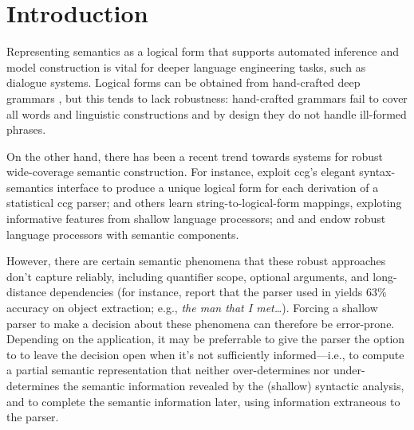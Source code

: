 \section{Introduction} \label{sec:intro}

Representing semantics as a logical form that supports automated
inference and model construction is vital for deeper language
engineering tasks, such as dialogue systems.  Logical forms
can be obtained from hand-crafted deep grammars
\cite{butt:etal:1999,copestake:flickinger:2000}, but this
tends to lack robustness: hand-crafted grammars fail to cover all
words and linguistic constructions and by design they do not handle
ill-formed phrases. 

On the other hand, there has been a recent trend towards systems for
robust wide-coverage semantic construction.  For instance,
\cite{bos:etal:2004} exploit
{\sc ccg}'s elegant syntax-semantics interface to produce a unique
logical form for each derivation of
a statistical {\sc ccg} parser;
\cite{zettlemoyer:collins:2007} and others learn
string-to-logical-form mappings, exploting informative features from
shallow language processors; and \cite{copestake:2003} and
\cite{frank:2004}
endow robust language processors with semantic components.

However, there are certain semantic
phenomena that these robust
approaches don't capture reliably, including quantifier scope, optional
arguments,
% 
and long-distance dependencies (for instance, \cite{clark:etal:2004}
report that the parser used in \cite{bos:etal:2004} yields 63\%
accuracy on object
extraction; e.g., {\em the man that I met\dots}).
Forcing a shallow parser to make a decision about these
phenomena can therefore be error-prone.  Depending on the
application, it may be preferrable to give the parser the option to to
leave the decision open when it's not sufficiently informed---i.e., to
compute a partial semantic representation that neither over-determines
nor under-determines the semantic information revealed by the
(shallow) syntactic analysis, and to complete the semantic information
later, using information extraneous to the
parser.

